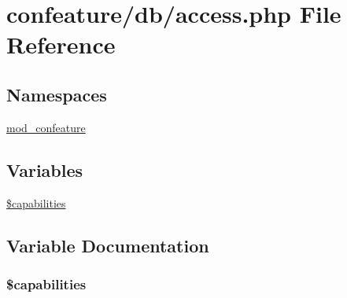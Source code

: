 \hypertarget{access_8php}{\section{confeature/db/access.php File Reference}
\label{access_8php}
}
\subsection*{Namespaces}
\begin{DoxyCompactItemize}
\item 
\hyperlink{namespacemod__confeature}{mod\-\_\-confeature}
\end{DoxyCompactItemize}
\subsection*{Variables}
\begin{DoxyCompactItemize}
\item 
\hyperlink{access_8php_a3bd1a55d998861e02e56c127f4b46c94}{\$capabilities}
\end{DoxyCompactItemize}


\subsection{Variable Documentation}
\hypertarget{access_8php_a3bd1a55d998861e02e56c127f4b46c94}{
\subsubsection[{\$capabilities}]{\setlength{\rightskip}{0pt plus 5cm}\$capabilities}}\label{access_8php_a3bd1a55d998861e02e56c127f4b46c94}
